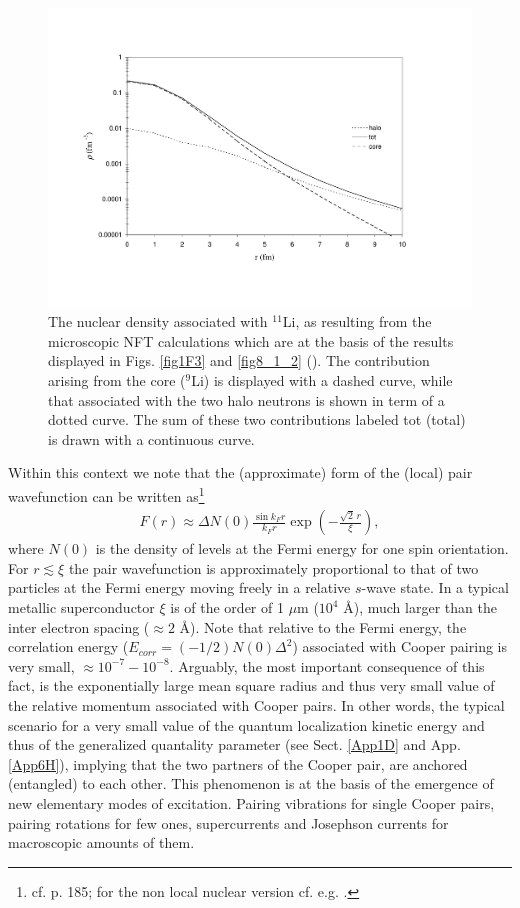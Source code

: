 \begin{figure}
\centerline{\includegraphics*[width=15cm,angle=0]{nutshell/figs/fig3_2_2.pdf}}
\caption{The nuclear density associated with $^{11}$Li, as resulting from the microscopic NFT calculations which are at the basis of the results displayed in Figs. \ref{fig1F3} and \ref{fig8_1_2} (\cite{Barranco:01}). The contribution arising from the core ($^{9}$Li) is displayed with a dashed curve, while that associated with the two halo neutrons is shown in term of a dotted curve. The sum of these two contributions  labeled tot (total) is drawn with a continuous curve.}\label{fig3.2.2}
\end{figure}
Within this context we note that the (approximate) form of the (local) pair wavefunction can be written as\footnote{cf. \cite{Leggett:06} p. 185; for the non local nuclear version cf. e.g. \cite{Broglia:83c}.}
\begin{align}\label{eq4.3.2}
F(r)\approx\Delta N(0)\frac{\sin k_F r}{k_Fr}\exp\left(-\frac{\sqrt{2}\,r}{\xi}\right),
\end{align}
where $N(0)$ is the density of levels at the Fermi energy for one spin orientation. For $r\lesssim\xi$ the pair wavefunction is approximately proportional to that of two particles at the Fermi energy moving freely in a relative $s$-wave state. In a typical metallic superconductor $\xi$ is of the order of 1 $\mu$m ($10^4$ \AA), much larger than the inter electron spacing ($\approx 2$ \AA). Note that relative to the Fermi energy, the correlation energy ($E_{corr}=(-1/2)N(0)\Delta^2$) associated with Cooper pairing is very small, $\approx 10^{-7}-10^{-8}$. Arguably, the most important consequence of this fact, is the exponentially large mean square radius and thus very small value of the relative momentum associated with Cooper pairs. In other words, the typical scenario for a very small value of the quantum localization kinetic energy and thus of the generalized quantality parameter  (see Sect. \ref{App1D} and App. \ref{App6H}), implying that the two partners of the Cooper pair, are  anchored (entangled) to each other. This phenomenon is at the basis  of the emergence of new elementary modes of excitation. Pairing vibrations for single Cooper pairs, pairing rotations for few ones, supercurrents and Josephson currents for macroscopic amounts of them.



